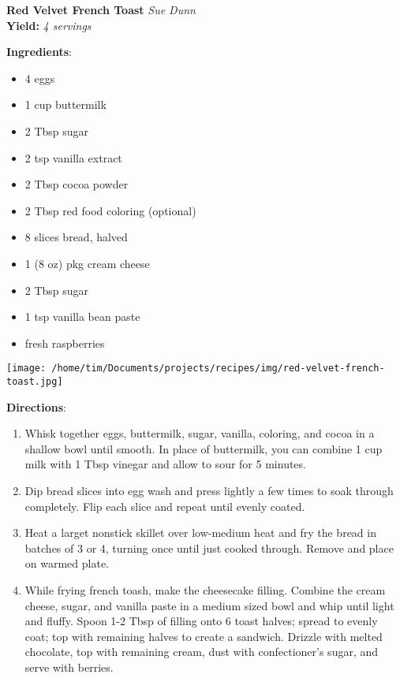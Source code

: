 \documentclass[11pt, twoside, openany]{book}
\begin{document}
\noindent\begin{minipage}[t]{\linewidth}%
{\Large\textbf{Red Velvet French Toast}} \label{red-velvet-french-toast}\hfill\textit{Sue Dunn}\\
\textbf{Yield:} \textit{4 servings}\\
\noindent\begin{minipage}[t]{0.78\linewidth}%
\textbf{Ingredients}:\vspace{-3mm}
\begin{multicols}{2}
\begin{itemize}\setlength\itemsep{-1mm}
\item 4 eggs
\item 1 cup buttermilk
\item 2 Tbsp sugar
\item 2 tsp vanilla extract
\item 2 Tbsp cocoa powder
\item 2 Tbsp red food coloring (optional)
\item 8 slices bread, halved
\item 1 (8 oz) pkg cream cheese
\item 2 Tbsp sugar
\item 1 tsp vanilla bean paste
\item fresh raspberries
\end{itemize}
\end{multicols}
\end{minipage}
\noindent\begin{minipage}[t]{0.18\linewidth}
\centering \strut\vspace*{-\baselineskip}\newline
\texttt{[image: /home/tim/Documents/projects/recipes/img/red-velvet-french-toast.jpg]}\\
\end{minipage}\vspace{3mm}
\textbf{Directions}:
\vspace{-3mm}\begin{enumerate}\setlength\itemsep{-1mm}
\item Whisk together eggs, buttermilk, sugar, vanilla, coloring, and cocoa in a shallow bowl until smooth. In place of buttermilk, you can combine 1 cup milk with 1 Tbsp vinegar and allow to sour for 5 minutes.
\item Dip bread slices into egg wash and press lightly a few times to soak through completely. Flip each slice and repeat until evenly coated.
\item Heat a larget nonstick skillet over low-medium heat and fry the bread in batches of 3 or 4, turning once until just cooked through. Remove and place on warmed plate.
\item While frying french toash, make the cheesecake filling. Combine the cream cheese, sugar, and vanilla paste in a medium sized bowl and whip until light and fluffy. Spoon 1-2 Tbsp of filling onto 6 toast halves; spread to evenly coat; top with remaining halves to create a sandwich. Drizzle with melted chocolate, top with remaining cream, dust with confectioner's sugar, and serve with berries.
\end{enumerate}
\end{minipage}\vspace{8mm}
\end{document}
